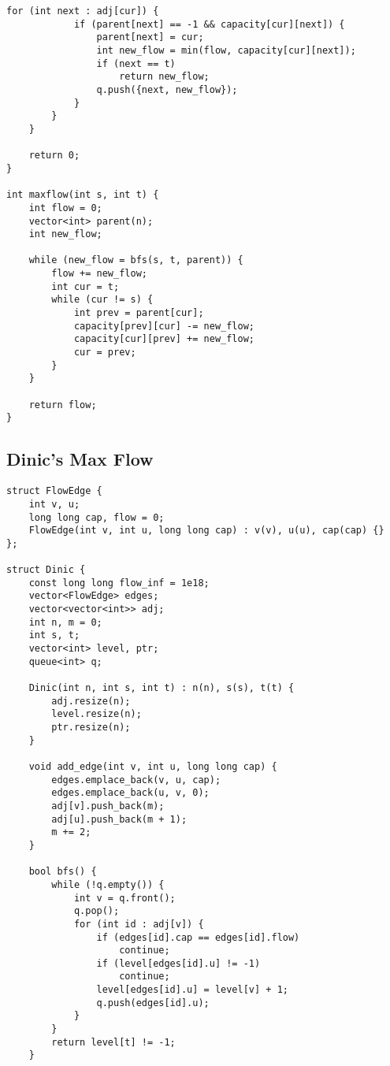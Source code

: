 \documentclass[10pt]{article}
\begin{document}
\begin{multicols*}{2}
\begin{lstlisting}[style=compactcpp]
        for (int next : adj[cur]) {
            if (parent[next] == -1 && capacity[cur][next]) {
                parent[next] = cur;
                int new_flow = min(flow, capacity[cur][next]);
                if (next == t)
                    return new_flow;
                q.push({next, new_flow});
            }
        }
    }

    return 0;
}

int maxflow(int s, int t) {
    int flow = 0;
    vector<int> parent(n);
    int new_flow;

    while (new_flow = bfs(s, t, parent)) {
        flow += new_flow;
        int cur = t;
        while (cur != s) {
            int prev = parent[cur];
            capacity[prev][cur] -= new_flow;
            capacity[cur][prev] += new_flow;
            cur = prev;
        }
    }

    return flow;
}
\end{lstlisting}

\subsection{Dinic's Max Flow}

\begin{lstlisting}[style=compactcpp]
struct FlowEdge {
    int v, u;
    long long cap, flow = 0;
    FlowEdge(int v, int u, long long cap) : v(v), u(u), cap(cap) {}
};

struct Dinic {
    const long long flow_inf = 1e18;
    vector<FlowEdge> edges;
    vector<vector<int>> adj;
    int n, m = 0;
    int s, t;
    vector<int> level, ptr;
    queue<int> q;

    Dinic(int n, int s, int t) : n(n), s(s), t(t) {
        adj.resize(n);
        level.resize(n);
        ptr.resize(n);
    }

    void add_edge(int v, int u, long long cap) {
        edges.emplace_back(v, u, cap);
        edges.emplace_back(u, v, 0);
        adj[v].push_back(m);
        adj[u].push_back(m + 1);
        m += 2;
    }

    bool bfs() {
        while (!q.empty()) {
            int v = q.front();
            q.pop();
            for (int id : adj[v]) {
                if (edges[id].cap == edges[id].flow)
                    continue;
                if (level[edges[id].u] != -1)
                    continue;
                level[edges[id].u] = level[v] + 1;
                q.push(edges[id].u);
            }
        }
        return level[t] != -1;
    }


\end{lstlisting}
\end{multicols*}
\end{document}
